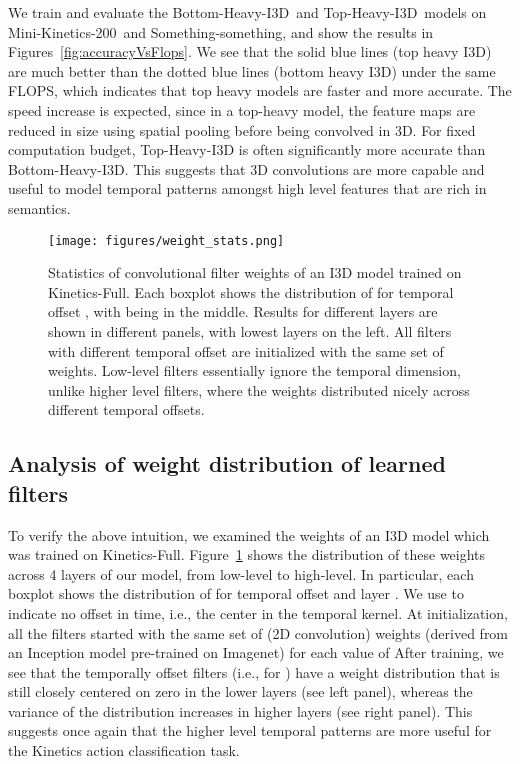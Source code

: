 \documentclass[runningheads]{llncs}
\newcommand{\pyramid}{Bottom-Heavy-I3D}
\newcommand{\invpyramid}{Top-Heavy-I3D}
\newcommand{\MK}{Mini-Kinetics-200}
\newcommand{\Something}{Something-something}
\newcommand{\FK}{Kinetics-Full}
\begin{document}
We train and evaluate the \pyramid\ and \invpyramid\ models on \MK\ and \Something,
and show the results in Figures~\ref{fig:accuracyVsFlops}.
We see that the solid blue lines (top heavy I3D) are much better than the dotted blue lines (bottom heavy I3D) under the same FLOPS, which indicates that top heavy models are faster and more accurate.
The speed increase is expected, since  in a top-heavy model,
the feature maps are reduced in size using spatial pooling before being convolved in 3D. For fixed computation budget, Top-Heavy-I3D is often significantly more accurate than Bottom-Heavy-I3D. This suggests that 3D convolutions are more capable and useful to model temporal patterns amongst high level features that are rich in semantics.

\begin{figure}[t]
\centering
  \texttt{[image: figures/weight\_stats.png]}
  \caption{Statistics of convolutional filter weights of an I3D model trained on \FK. Each boxplot shows the distribution of  for temporal offset , with  being in the middle.
  Results for
  different layers  are shown in different panels,
  with lowest layers on the left.
 All filters with different temporal offset are initialized with the same set of weights. Low-level
 filters essentially ignore the temporal dimension,
 unlike higher level filters,
 where the weights distributed nicely across different temporal offsets. }
  \label{fig:weights}
\end{figure}

\subsection{Analysis of weight distribution of learned filters}

To verify the above intuition, we examined the  weights of an I3D model
which was trained on \FK.
Figure~\ref{fig:weights} shows the distribution of these weights across  4 layers of our model, from low-level to high-level. In particular, each boxplot shows the distribution of  for temporal offset  and layer . 
We use  to indicate no offset in time, i.e.,  
the center in the temporal kernel. 
At initialization, all the filters started with the same set of (2D convolution) weights (derived from an Inception model pre-trained on Imagenet) for each value of 
After training, we see that the temporally offset filters (i.e., for ) have a weight distribution that is still closely centered on zero in the lower layers (see left panel), whereas the variance of the distribution increases in higher layers (see right panel).
This suggests once again that the higher level temporal patterns are more useful for the Kinetics action classification task.
\end{document}
